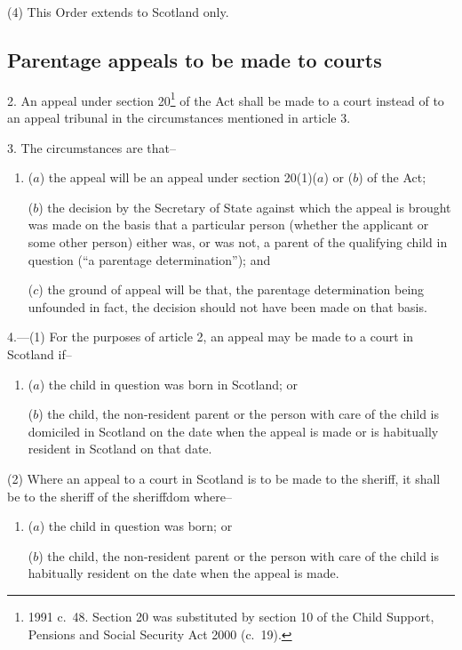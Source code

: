 \documentclass[12pt,a4paper]{article}
\begin{document}
(4) This Order extends to Scotland only.

\subsection[2--4. Parentage appeals to be made to courts]{Parentage appeals to be made to courts}

2.  An appeal under section 20\footnote{1991 c.\ 48. Section 20 was substituted by section 10 of the Child Support, Pensions and Social Security Act 2000 (c.\ 19).} of the Act shall be made to a court instead of to an appeal tribunal in the circumstances mentioned in article 3.

\medskip

3.  The circumstances are that–
\begin{enumerate}\item[]
($a$) the appeal will be an appeal under section 20(1)($a$)  or ($b$)  of the Act;

($b$) the decision by the Secretary of State against which the appeal is brought was made on the basis that a particular person (whether the applicant or some other person) either was, or was not, a parent of the qualifying child in question (“a parentage determination”); and

($c$) the ground of appeal will be that, the parentage determination being unfounded in fact, the decision should not have been made on that basis.
\end{enumerate}

\medskip

4.---(1)  For the purposes of article 2, an appeal may be made to a court in Scotland if–
\begin{enumerate}\item[]
($a$) the child in question was born in Scotland; or

($b$) the child, the non-resident parent or the person with care of the child is domiciled in Scotland on the date when the appeal is made or is habitually resident in Scotland on that date.
\end{enumerate}

(2) Where an appeal to a court in Scotland is to be made to the sheriff, it shall be to the sheriff of the sheriffdom where–
\begin{enumerate}\item[]
($a$) the child in question was born; or

($b$) the child, the non-resident parent or the person with care of the child is habitually resident on the date when the appeal is made.
\end{enumerate}
\end{document}
